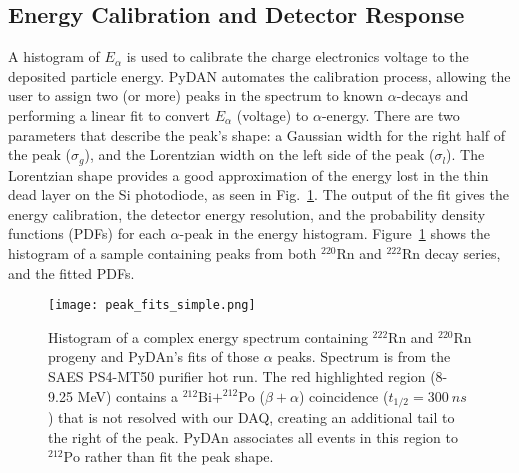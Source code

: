 \documentclass[final,3p,times]{elsarticle}
\begin{document}
\subsection{Energy Calibration and Detector Response}
\label{subsec:energy_calib}
A histogram of $E_\alpha$ is used to calibrate the charge electronics voltage to the deposited particle energy.
PyDAN automates the calibration process, allowing the user to assign two (or more) peaks in the spectrum to known $\alpha$-decays and performing a linear fit to convert $E_\alpha$ (voltage) to $\alpha$-energy. 
There are two parameters that describe the peak's
shape: a Gaussian width for the right half of the peak ($\sigma_g$), and the Lorentzian width on the left side of the peak ($\sigma_l$).
The Lorentzian shape provides a good approximation of the energy lost in the thin dead layer on the Si photodiode, as seen in Fig.~\ref{fig:energy_fit}. 
The output of the fit gives the energy calibration, the detector energy resolution, and the probability density functions (PDFs) for each $\alpha$-peak in the energy histogram. 
Figure~\ref{fig:energy_fit} shows the histogram of a sample containing peaks from both $^{220}\text{Rn}$ and $^{222}\text{Rn}$ decay series, and the fitted PDFs. 
\begin{figure}
    \centering
    \texttt{[image: peak\_fits\_simple.png]}
    \caption{Histogram of a complex energy spectrum containing $^{222}\text{Rn}$ and $^{220}\text{Rn}$ progeny and PyDAn's fits of those $\alpha$ peaks. Spectrum is from the SAES PS4-MT50 purifier hot run. The red highlighted region (8-9.25 MeV) contains a $^{212}\text{Bi}+^{212}\text{Po}$ ($\beta+\alpha$) coincidence ($t_{1/2}=300~ns$) that is not resolved with our DAQ, creating an additional tail to the right of the peak. PyDAn associates all events in this region to $^{212}\text{Po}$ rather than fit the peak shape.}
    \label{fig:energy_fit}
\end{figure}
\end{document}

